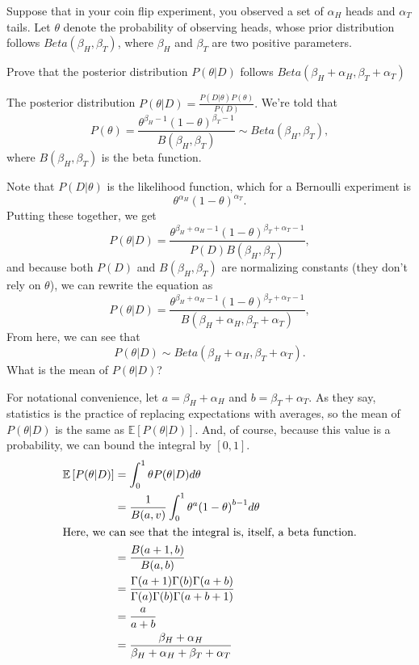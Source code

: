\documentclass[11pt,largemargins]{homework}
\begin{document}
\maketitle
\question
Suppose that in your coin flip experiment, you observed a set of $\alpha_H$ heads and $\alpha_T$ tails. Let $\theta$ denote the probability of observing heads, whose prior distribution follows $Beta(\beta_H, \beta_T)$, where $\beta_H$ and $\beta_T$ are two positive parameters. 
\begin{alphaparts}
    \questionpart
    Prove that the posterior distribution $P(\theta|D)$ follows $Beta(\beta_H + \alpha_H, \beta_T + \alpha_T)$

	The posterior distribution $P(\theta|D)=\frac{P(D|\theta)P(\theta)}{P(D)}.$ We're told that $$P(\theta)=\frac{\theta^{\beta_H-1}{(1-\theta)}^{\beta_T-1}}{B(\beta_H, \beta_T)} \sim Beta(\beta_H, \beta_T),$$ where $B(\beta_H, \beta_T)$ is the beta function.

	Note that $P(D|\theta)$ is the likelihood function, which for a Bernoulli experiment is $$\theta^{\alpha_H}{(1-\theta)}^{\alpha_T}.$$
	Putting these together, we get $$P(\theta|D)=\frac{\theta^{\beta_H+\alpha_H-1}{(1-\theta)}^{\beta_T+\alpha_T-1}}{P(D)B(\beta_H, \beta_T)},$$
	and because both $P(D)$ and $B(\beta_H, \beta_T)$ are normalizing constants (they don't rely on $\theta$), we can rewrite the equation as 
	$$P(\theta|D)=\frac{\theta^{\beta_H+\alpha_H-1}{(1-\theta)}^{\beta_T+\alpha_T-1}}{B(\beta_H+\alpha_H, \beta_T+\alpha_T)},$$
	From here, we can see that $$P(\theta|D)\sim Beta(\beta_H+\alpha_H, \beta_T+\alpha_T).$$ 
	\questionpart
	What is the mean of $P(\theta|D)$?

	For notational convenience, let $a=\beta_H+\alpha_H$ and $b=\beta_T+\alpha_T$. As they say, statistics is the practice of replacing expectations with averages, so the mean of $P(\theta|D)$ is the same as $\mathbb{E}\left[ P(\theta|D)\right].$ And, of course, because this value is a probability, we can bound the integral by $[0, 1].$
	\begin{align*}
		\mathbb{E}\left[ P(\theta|D)\right] &= \int_{0}^1{\theta P(\theta|D)d\theta} \\
											&= \frac{1}{B(a, v)}\int_0^1{\theta^a{(1-\theta)}^{b-1}d\theta}\\
	\intertext{Here, we can see that the integral is, itself, a beta function.}
	&= \frac{B(a+1, b)}{B(a, b)}\\
	&= \frac{\Gamma(a+1)\Gamma(b)\Gamma(a+b)}{\Gamma(a)\Gamma(b)\Gamma(a+b+1)}\\
	&= \frac{a}{a+b}\\
	&= \frac{\beta_H+\alpha_H}{\beta_H+\alpha_H+\beta_T+\alpha_T}
	\end{align*}


\end{alphaparts}
\end{document}
